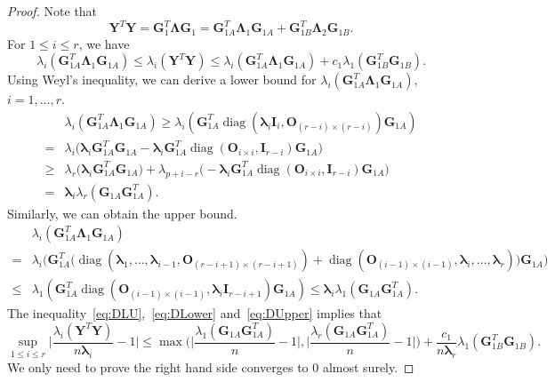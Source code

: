 \documentclass[12pt]{article} %
\DeclareMathOperator{\mydiag}{diag}
\newcommand{\bA}{\mathbf{A}}
\newcommand{\bY}{\mathbf{Y}}
\newcommand{\bG}{\mathbf{G}}
\newcommand{\bO}{\mathbf{O}}
\newcommand{\bI}{\mathbf{I}}
\newcommand{\bD}{\mathbf{D}}
\newcommand{\bV}{\mathbf{V}}
\newcommand{\bfsym}[1]{\ensuremath{\boldsymbol{#1}}}
\def\blambda {\bfsym {\lambda}}
\def\bLambda {\bfsym {\Lambda}}
\theoremstyle{definition}
\begin{document}
\begin{proof}
    Note that
$$
\bY^T \bY =\bG_1^T \bLambda \bG_1
=
\bG_{1A}^T \bLambda_1 \bG_{1A}+
\bG_{1B}^T \bLambda_2 \bG_{1B}.
$$
For $1\leq i \leq r$, we have
    \begin{equation}\label{eq:DLU}
\lambda_i(\bG_{1A}^T \bLambda_1 \bG_{1A})
    \leq \lambda_i(\bY^T \bY) \leq \lambda_i(\bG_{1A}^T \bLambda_1 \bG_{1A})+
    c_1 \lambda_1(\bG_{1B}^T  \bG_{1B}).
    \end{equation}
 Using Weyl's inequality, we can derive a lower bound for $\lambda_i(\bG_{1A}^T \bLambda_1 \bG_{1A})$, $ i=1,\ldots, r$.
\begin{equation}\label{eq:DLower}
\begin{aligned}
&\lambda_i(\bG_{1A}^T \bLambda_1 \bG_{1A})
\geq
\lambda_i(\bG_{1A}^T \mydiag(\blambda_i \bI_{i},\bO_{(r-i)\times(r-i)}) \bG_{1A})
\\
    =&
    \lambda_i\Big( \blambda_i \bG_{1A}^T \bG_{1A}-\blambda_i\bG_{1A}^T \mydiag(\bO_{i\times i}, \bI_{r-i}) \bG_{1A}\Big)\\
    \geq&
    \lambda_r\Big( \blambda_i \bG_{1A}^T \bG_{1A}\Big)+\lambda_{p+i-r}\Big(-\blambda_i\bG_{1A}^T \mydiag(\bO_{i\times i}, \bI_{r-i}) \bG_{1A}\Big)\\
= &
\blambda_i \lambda_r(\bG_{1A}\bG_{1A}^T).
\end{aligned}
\end{equation}
Similarly, we can obtain the upper bound.
\begin{equation}\label{eq:DUpper}
\begin{aligned}
&\lambda_i(\bG_{1A}^T \bLambda_1 \bG_{1A})
\\
=&\lambda_i\Big(
\bG_{1A}^T \big(
\mydiag(\blambda_1,\ldots,\blambda_{i-1},\bO_{(r-i+1)\times(r-i+1)})+
\mydiag(\bO_{(i-1)\times(i-1)},\blambda_i,\ldots,\blambda_r)
\big)
\bG_{1A}
\Big)\\
    \leq&
\lambda_1(\bG_{1A}^T \mydiag(\bO_{(i-1)\times(i-1)},\blambda_i \bI_{r-i+1}) \bG_{1A})
\leq  \blambda_i \lambda_1(\bG_{1A}\bG_{1A}^T).
\end{aligned}
\end{equation}
    The inequality~\eqref{eq:DLU},~\eqref{eq:DLower} and~\eqref{eq:DUpper} implies that
    $$
   \sup_{1\leq i \leq r} \Big|\frac{\lambda_i(\bY^T \bY)}{n\blambda_i}-1\Big|\leq
    \max\Big(\Big|\frac{\lambda_1(\bG_{1A}\bG_{1A}^T)}{n}-1\Big|,\Big|\frac{\lambda_r(\bG_{1A}\bG_{1A}^T)}{n}-1\Big|\Big)+\frac{c_1}{n\blambda_r}\lambda_1(\bG_{1B}^T \bG_{1B}).
    $$
    We only need to prove the right hand side converges to $0$ almost surely.


\end{proof}
\end{document}
